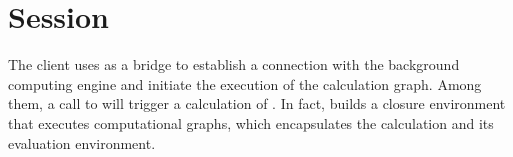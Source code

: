 \begin{savequote}[45mm]
\end{savequote}


\chapter{Session}
\label{ch:session}
\begin{content}
The client uses  as a bridge to establish a connection with the background computing engine and initiate the execution of the calculation graph. Among them, a call to  will trigger a calculation of .
In fact,  builds a closure environment that executes computational graphs, which encapsulates the  calculation and its  evaluation environment.
\end{content}


